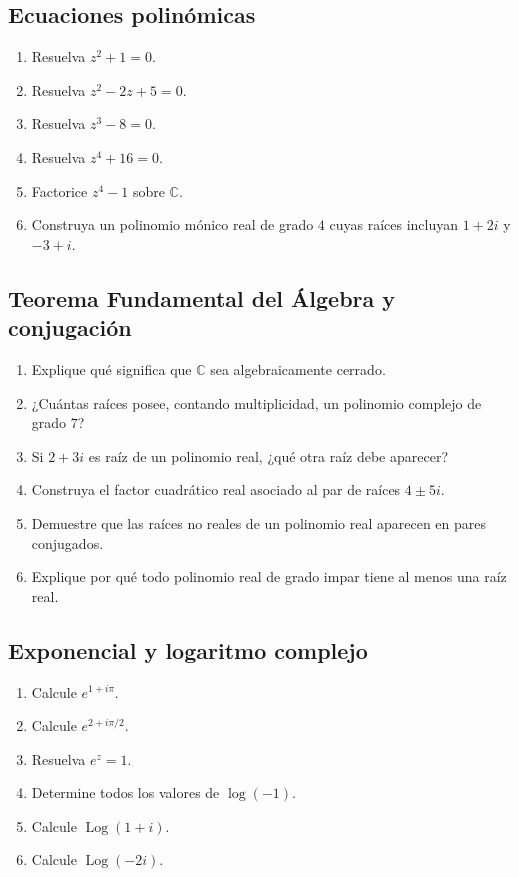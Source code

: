 \subsection{Ecuaciones polinómicas}
\begin{enumerate}
\item Resuelva $z^2+1=0$.
\item Resuelva $z^2-2z+5=0$.
\item Resuelva $z^3-8=0$.
\item Resuelva $z^4+16=0$.
\item Factorice $z^4-1$ sobre $\mathbb{C}$.
\item Construya un polinomio mónico real de grado $4$ cuyas raíces incluyan $1+2i$ y $-3+i$.
\end{enumerate}

\subsection{Teorema Fundamental del Álgebra y conjugación}
\begin{enumerate}
\item Explique qué significa que $\mathbb{C}$ sea algebraicamente cerrado.
\item ¿Cuántas raíces posee, contando multiplicidad, un polinomio complejo de grado $7$?
\item Si $2+3i$ es raíz de un polinomio real, ¿qué otra raíz debe aparecer?
\item Construya el factor cuadrático real asociado al par de raíces $4\pm5i$.
\item Demuestre que las raíces no reales de un polinomio real aparecen en pares conjugados.
\item Explique por qué todo polinomio real de grado impar tiene al menos una raíz real.
\end{enumerate}

\subsection{Exponencial y logaritmo complejo}
\begin{enumerate}
\item Calcule $e^{1+i\pi}$.
\item Calcule $e^{2+i\pi/2}$.
\item Resuelva $e^z=1$.
\item Determine todos los valores de $\log(-1)$.
\item Calcule $\operatorname{Log}(1+i)$.
\item Calcule $\operatorname{Log}(-2i)$.
\end{enumerate}

